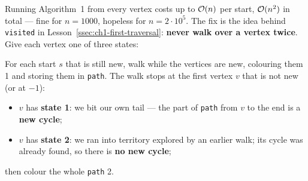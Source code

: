 Running Algorithm~1 from every vertex costs up to $\mathcal{O}(n)$ per start, $\mathcal{O}(n^2)$ in total --- fine for $n = 1000$, hopeless for $n = 2\cdot 10^5$. The fix is the idea behind \texttt{visited} in Lesson~\ref{ssec:ch1-first-traversal}: \textbf{never walk over a vertex twice}. Give each vertex one of three states:
\begin{center}
 \qquad {} \qquad {}
\end{center}
For each start $s$ that is still new, walk while the vertices are new, colouring them 1 and storing them in \texttt{path}. The walk stops at the first vertex $v$ that is not new (or at $-1$):
\begin{itemize}[leftmargin=*]
    \item $v$ has \textbf{state 1}: we bit our own tail --- the part of \texttt{path} from $v$ to the end is a \textbf{new cycle};
    \item $v$ has \textbf{state 2}: we ran into territory explored by an earlier walk; its cycle was already found, so there is \textbf{no new cycle};
\end{itemize}
then colour the whole \texttt{path} 2.

